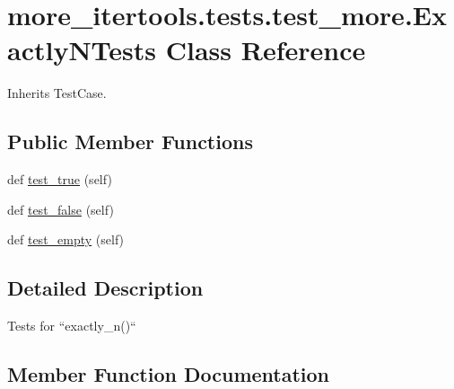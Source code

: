 \hypertarget{classmore__itertools_1_1tests_1_1test__more_1_1_exactly_n_tests}{}\section{more\+\_\+itertools.\+tests.\+test\+\_\+more.\+Exactly\+N\+Tests Class Reference}
\label{classmore__itertools_1_1tests_1_1test__more_1_1_exactly_n_tests}


Inherits Test\+Case.

\subsection*{Public Member Functions}
\begin{DoxyCompactItemize}
\item 
def \hyperlink{classmore__itertools_1_1tests_1_1test__more_1_1_exactly_n_tests_a704473fe834e854a3d6470292f83b970}{test\+\_\+true} (self)
\item 
def \hyperlink{classmore__itertools_1_1tests_1_1test__more_1_1_exactly_n_tests_a46cbdb55835504628fd0da7d9c158281}{test\+\_\+false} (self)
\item 
def \hyperlink{classmore__itertools_1_1tests_1_1test__more_1_1_exactly_n_tests_a05dcb93aa33195926a1f75a8853d0af6}{test\+\_\+empty} (self)
\end{DoxyCompactItemize}


\subsection{Detailed Description}
\begin{DoxyVerb}Tests for ``exactly_n()``\end{DoxyVerb}
 

\subsection{Member Function Documentation}
\mbox{\label{classmore__itertools_1_1tests_1_1test__more_1_1_exactly_n_tests_a05dcb93aa33195926a1f75a8853d0af6}} 
